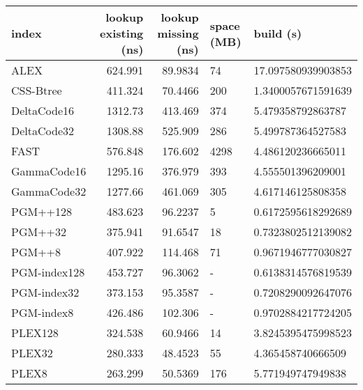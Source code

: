 \begin{tabular}{lrrll}
\hline
 index             &   lookup existing (ns) &   lookup missing (ns) & space (MB)   & build (s)             \\
\hline
 ALEX              &                624.991 &               89.9834 & 74           & 17.097580939903853    \\
 CSS-Btree         &                411.324 &               70.4466 & 200          & 1.3400057671591639    \\
 DeltaCode16       &               1312.73  &              413.469  & 374          & 5.479358792863787     \\
 DeltaCode32       &               1308.88  &              525.909  & 286          & 5.499787364527583     \\
 FAST              &                576.848 &              176.602  & 4298         & 4.486120236665011     \\
 GammaCode16       &               1295.16  &              376.979  & 393          & 4.555501396209001     \\
 GammaCode32       &               1277.66  &              461.069  & 305          & 4.617146125808358     \\
 PGM++128          &                483.623 &               96.2237 & 5            & 0.6172595618292689    \\
 PGM++32           &                375.941 &               91.6547 & 18           & 0.7323802512139082    \\
 PGM++8            &                407.922 &              114.468  & 71           & 0.9671946777030827    \\
 PGM-index128      &                453.727 &               96.3062 & -            & 0.6138314576819539    \\
 PGM-index32       &                373.153 &               95.3587 & -            & 0.7208290092647076    \\
 PGM-index8        &                426.486 &              102.306  & -            & 0.9702884217724205    \\
 PLEX128           &                324.538 &               60.9466 & 14           & 3.8245395475998523    \\
 PLEX32            &                280.333 &               48.4523 & 55           & 4.365458740666509     \\
 PLEX8             &                263.299 &               50.5369 & 176          & 5.771949747949838     \\

\end{tabular}
